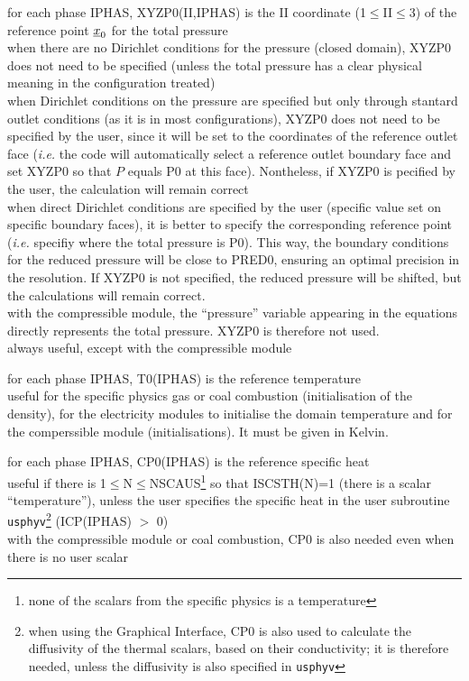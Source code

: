 {for each phase IPHAS, XYZP0(II,IPHAS) is the II coordinate
(1$\leqslant$II$\leqslant$3) of the reference point $\underline{x}_0$ for the
total pressure\\
when there are no Dirichlet conditions for the pressure (closed domain), XYZP0
does not need to be specified (unless the total pressure has a clear physical
meaning in the configuration treated)\\
when Dirichlet conditions on the pressure are specified but only through stantard
outlet conditions (as it is in most configurations),
XYZP0 does not need to be specified by the user, since it will be set to the
coordinates of the reference outlet face ({\em i.e.} the code will automatically
select a
reference outlet boundary face and set XYZP0 so that $P$ equals P0 at this
face). Nontheless, if XYZP0 is pecified by the user, the calculation will remain
correct\\
when direct Dirichlet conditions are specified by the user (specific value set
on specific boundary faces), it is better to specify the corresponding reference
point ({\em i.e.} specifiy where the total pressure is P0). This way, the
boundary conditions for the reduced pressure will be close to PRED0, ensuring an
optimal precision in the resolution. If XYZP0 is not specified, the reduced
pressure will be shifted, but the calculations will remain correct.\\
with the compressible module, the ``pressure'' variable appearing in the
equations directly represents the total pressure. XYZP0 is therefore not used.\\
always useful, except with the compressible module}

{for each phase IPHAS, T0(IPHAS) is the reference temperature \\
useful for the specific physics gas or coal combustion (initialisation
of the density), for the electricity modules to initialise the domain
temperature and for the comperssible module (initialisations). It must be given
in Kelvin.}

{for each phase IPHAS, CP0(IPHAS) is the reference specific heat\\
useful if there is 1$\leqslant$N$\leqslant$NSCAUS\footnote{none of the scalars
from the specific physics is a temperature} so that ISCSTH(N)=1
(there is a scalar ``temperature''), unless the user specifies the
specific heat in the user subroutine \texttt{usphyv}\footnote{when using the
Graphical Interface, CP0 is also used to calculate the diffusivity of the
thermal scalars, based on their conductivity; it is therefore needed, unless the
diffusivity is also specified in \texttt{usphyv}} (ICP(IPHAS) $>$ 0)\\
with the compressible module or coal combustion, CP0 is also needed even when
there is no user scalar}

